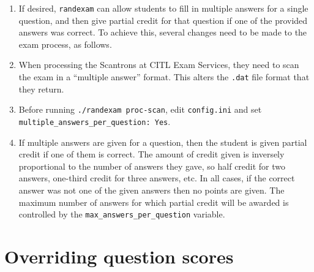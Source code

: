 \documentclass{article}
\begin{document}
\begin{enumerate}
\item If desired, \texttt{randexam} can allow students to fill in
  multiple answers for a single question, and then give partial credit
  for that question if one of the provided answers was correct. To
  achieve this, several changes need to be made to the exam process,
  as follows.
\item When processing the Scantrons at CITL Exam Services, they need
  to scan the exam in a ``multiple answer'' format. This alters the
  \texttt{.dat} file format that they return.
\item Before running \texttt{./randexam proc-scan}, edit
  \texttt{config.ini} and set \texttt{multiple_answers_per_question:
    Yes}.
\item If multiple answers are given for a question, then the student
  is given partial credit if one of them is correct. The amount of
  credit given is inversely proportional to the number of answers they
  gave, so half credit for two answers, one-third credit for three
  answers, etc. In all cases, if the correct answer was not one of the
  given answers then no points are given. The maximum number of
  answers for which partial credit will be awarded is controlled by
  the \texttt{max_answers_per_question} variable.
\end{enumerate}

\section{Overriding question scores}
\end{document}
